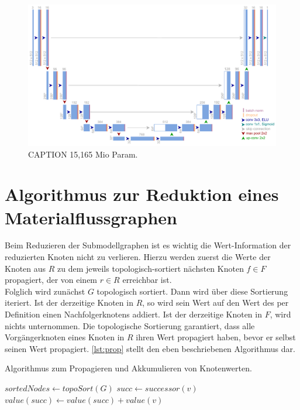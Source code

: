 \begin{figure}
	\centering
	\includegraphics[width=1.\textwidth]{Bilder/own-unet-15mil.pdf} 
	\caption{CAPTION 15,165 Mio Param.}
	\label{fig:own-unet-15mil}
\end{figure} 

\section{Algorithmus zur Reduktion eines Materialflussgraphen} \label{sec:reduction}

Beim Reduzieren der Submodellgraphen ist es wichtig die Wert-Information der reduzierten Knoten nicht zu verlieren. Hierzu werden zuerst die Werte der Knoten aus $R$ zu dem jeweils topologisch-sortiert nächsten Knoten $f \in F$ propagiert, der von einem $r \in R$ erreichbar ist. \\
Folglich wird zunächst $G$ topologisch sortiert. Dann wird über diese Sortierung iteriert. Ist der derzeitige Knoten in $R$, so wird sein Wert auf den Wert des per Definition einen Nachfolgerknotens addiert. Ist der derzeitige Knoten in $F$, wird nichts unternommen. Die topologische Sortierung garantiert, dass alle Vorgängerknoten eines Knoten in $R$ ihren Wert propagiert haben, bevor er selbst seinen Wert propagiert. \autoref{lst:prop} stellt den eben beschriebenen Algorithmus dar.

\begin{algorithm}
	\caption{Algorithmus zum Propagieren und Akkumulieren von Knotenwerten.}\label{lst:prop}
	\begin{algorithmic}[1]
		 
			\State $sortedNodes \gets topoSort(G)$
					\State $succ \gets successor(v)$ 
					\State $value(succ) \gets value(succ) + value(v)$
				\EndIf
			\EndFor
		\EndProcedure
	\end{algorithmic}
\end{algorithm}

